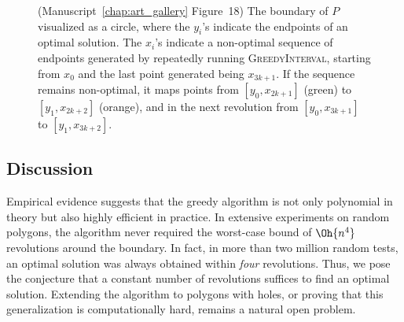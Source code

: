 \begin{figure}[ht]
    
    \caption{(Manuscript~\ref{chap:art_gallery} Figure~18) The boundary of $P$ visualized as a circle, where the $y_i$'s indicate the endpoints of an optimal solution. 
    The $x_i$'s indicate a non-optimal sequence of endpoints generated by repeatedly running \textsc{GreedyInterval}, starting from $x_0$ and the last point generated being $x_{3k +1}$. 
    If the sequence remains non-optimal, it maps points from $[y_0,x_{2k+1}]$ (green) to $[y_1,x_{2k+2}]$ (orange), and in the next revolution from  $[y_0,x_{3k+1}]$ to $[y_1,x_{3k + 2}]$.}
    \label{fig:local_seq_art_gall}
\end{figure}

\subsection{Discussion}

Empirical evidence suggests that the greedy algorithm is not only polynomial in theory but also highly efficient in practice. 
In extensive experiments on random polygons, the algorithm never required the worst-case bound of $\Oh{n^4}$ revolutions around the boundary. 
In fact, in more than two million random tests, an optimal solution was always obtained within \emph{four} revolutions. 
Thus, we pose the conjecture that a constant number of revolutions suffices to find an optimal solution. 
Extending the algorithm to polygons with holes, or proving that this generalization is computationally hard, remains a natural open problem. 




